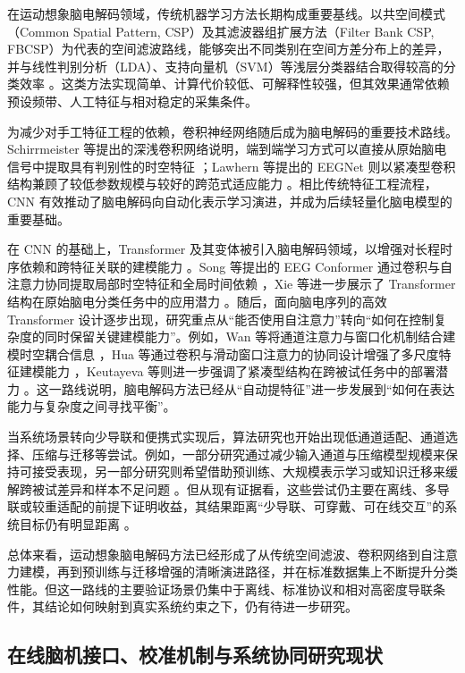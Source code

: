 在运动想象脑电解码领域，传统机器学习方法长期构成重要基线。以共空间模式（Common Spatial Pattern, CSP）及其滤波器组扩展方法（Filter Bank CSP, FBCSP）为代表的空间滤波路线，能够突出不同类别在空间方差分布上的差异，并与线性判别分析（LDA）、支持向量机（SVM）等浅层分类器结合取得较高的分类效率 \cite{ang2012filter, lotte2018review}。这类方法实现简单、计算代价较低、可解释性较强，但其效果通常依赖预设频带、人工特征与相对稳定的采集条件。

为减少对手工特征工程的依赖，卷积神经网络随后成为脑电解码的重要技术路线。Schirrmeister 等提出的深浅卷积网络说明，端到端学习方式可以直接从原始脑电信号中提取具有判别性的时空特征 \cite{schirrmeister2017deep}；Lawhern 等提出的 EEGNet 则以紧凑型卷积结构兼顾了较低参数规模与较好的跨范式适应能力 \cite{lawhern2018eegnet}。相比传统特征工程流程，CNN 有效推动了脑电解码向自动化表示学习演进，并成为后续轻量化脑电模型的重要基础。

在 CNN 的基础上，Transformer 及其变体被引入脑电解码领域，以增强对长程时序依赖和跨特征关联的建模能力 \cite{vaswani2017attention}。Song 等提出的 EEG Conformer 通过卷积与自注意力协同提取局部时空特征和全局时间依赖 \cite{songEEG2022}，Xie 等进一步展示了 Transformer 结构在原始脑电分类任务中的应用潜力 \cite{xie_transformer-based_2022}。随后，面向脑电序列的高效 Transformer 设计逐步出现，研究重点从“能否使用自注意力”转向“如何在控制复杂度的同时保留关键建模能力”。例如，Wan 等将通道注意力与窗口化机制结合建模时空耦合信息 \cite{wan2023novel}，Hua 等通过卷积与滑动窗口注意力的协同设计增强了多尺度特征建模能力 \cite{hua2023improved}，Keutayeva 等则进一步强调了紧凑型结构在跨被试任务中的部署潜力 \cite{keu2024compact}。这一路线说明，脑电解码方法已经从“自动提特征”进一步发展到“如何在表达能力与复杂度之间寻找平衡”。

当系统场景转向少导联和便携式实现后，算法研究也开始出现低通道适配、通道选择、压缩与迁移等尝试。例如，一部分研究通过减少输入通道与压缩模型规模来保持可接受表现，另一部分研究则希望借助预训练、大规模表示学习或知识迁移来缓解跨被试差异和样本不足问题 \cite{Wan22b, Jia24, Wan24b}。但从现有证据看，这些尝试仍主要在离线、多导联或较重适配的前提下证明收益，其结果距离“少导联、可穿戴、可在线交互”的系统目标仍有明显距离 \cite{Liu26b}。

总体来看，运动想象脑电解码方法已经形成了从传统空间滤波、卷积网络到自注意力建模，再到预训练与迁移增强的清晰演进路径，并在标准数据集上不断提升分类性能。但这一路线的主要验证场景仍集中于离线、标准协议和相对高密度导联条件，其结论如何映射到真实系统约束之下，仍有待进一步研究。

\subsection{在线脑机接口、校准机制与系统协同研究现状}

